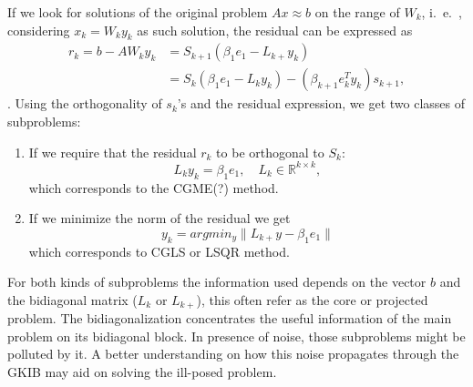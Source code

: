 \documentclass[11pt]{amsart}
\begin{document}
If we look for solutions of the original problem $Ax \approx b$ on the range of
$W_{k}$, i.~e.~, considering $x_{k} = W_{k}y_{k}$ as such solution, the residual
can be expressed as
\begin{align*}
  r_{k} = b - AW_{k}y_{k} &= S_{k+1}(\beta_{1}e_{1} - L_{k+}y_{k}) \\
  &= S_{k}(\beta_{1}e_{1} - L_{k}y_{k}) - 
  (\beta_{k+1}e_{k}^{T}y_{k})s_{k+1},
\end{align*}.
Using the orthogonality of $s_{k}$'s and the residual expression, we get two 
classes of subproblems:
\begin{enumerate}
  \item If we require that the residual $r_{k}$ to be orthogonal to $S_{k}$:
    \begin{equation*}
      L_{k}y_{k} = \beta_{1}e_{1}, \quad L_{k} \in \mathbb{R}^{k \times k},
    \end{equation*}
    which corresponds to the CGME(?) method.
  \item If we minimize the norm of the residual we get
    \begin{equation*}
      y_{k} = argmin_{y}\|L_{k+}y - \beta_{1}e_{1}\|
    \end{equation*}
    which corresponds to CGLS or LSQR method.
\end{enumerate}
For both kinds of subproblems the information used depends on the vector $b$ and
the bidiagonal matrix ($L_{k}$ or $L_{k+}$), this often refer as the core or
projected problem. The bidiagonalization concentrates the useful information of
the main problem on its bidiagonal block. In presence of noise, those
subproblems might be polluted by it. A better understanding on how this noise
propagates through the GKIB may aid on solving the ill-posed problem.
\end{document}
